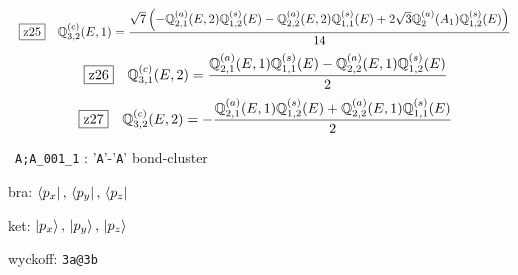 \documentclass[fleqn,10pt,landscape]{jsarticle}
\begin{document}
\begin{dmath*}
\hspace*{3mm}\fbox{z25}\quad \mathbb{Q}_{3,2}^{(c)}(E,1)=\frac{\sqrt{7} \left(- \mathbb{Q}_{2,1}^{(a)}(E,2) \mathbb{Q}_{1,2}^{(s)}(E) - \mathbb{Q}_{2,2}^{(a)}(E,2) \mathbb{Q}_{1,1}^{(s)}(E) + 2 \sqrt{3} \mathbb{Q}_{2}^{(a)}(A_{1}) \mathbb{Q}_{1,2}^{(s)}(E)\right)}{14}
\end{dmath*}
\begin{dmath*}
\hspace*{3mm}\fbox{z26}\quad \mathbb{Q}_{3,1}^{(c)}(E,2)=\frac{\mathbb{Q}_{2,1}^{(a)}(E,1) \mathbb{Q}_{1,1}^{(s)}(E) - \mathbb{Q}_{2,2}^{(a)}(E,1) \mathbb{Q}_{1,2}^{(s)}(E)}{2}
\end{dmath*}
\begin{dmath*}
\hspace*{3mm}\fbox{z27}\quad \mathbb{Q}_{3,2}^{(c)}(E,2)=- \frac{\mathbb{Q}_{2,1}^{(a)}(E,1) \mathbb{Q}_{1,2}^{(s)}(E) + \mathbb{Q}_{2,2}^{(a)}(E,1) \mathbb{Q}_{1,1}^{(s)}(E)}{2}
\end{dmath*}
\vspace{5mm}

\noindent\textbullet\, \texttt{A;A_001_1} : '\texttt{A}'-'\texttt{A}' bond-cluster

\noindent\quad * bra: $\bra{p_{x}},\, \bra{p_{y}},\, \bra{p_{z}}$

\noindent\quad * ket: $\ket{p_{x}},\, \ket{p_{y}},\, \ket{p_{z}}$

\noindent\quad * wyckoff: \texttt{3a@3b}
\end{document}
